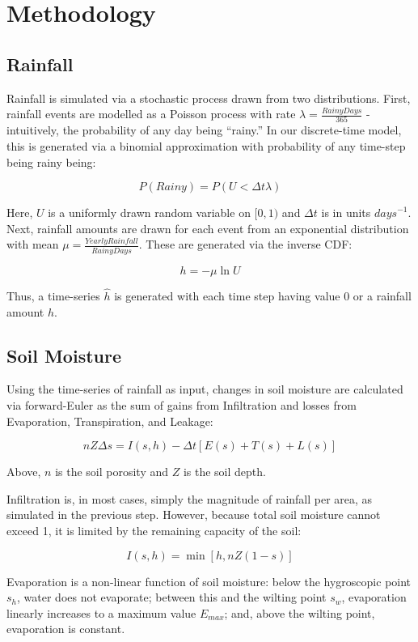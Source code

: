 \documentclass[12pt, letterpaper]{article}
\begin{document}
\section{Methodology}
\subsection{Rainfall}

Rainfall is simulated via a stochastic process drawn from two distributions. First, rainfall events are modelled as a Poisson process with rate $\lambda = \frac{RainyDays}{365}$ - intuitively, the probability of any day being “rainy.” In our discrete-time model, this is generated via a binomial approximation with probability of any time-step being rainy being:

$$ P(Rainy) = P(U < \Delta t \lambda) $$

Here, $U$ is a uniformly drawn random variable on $[0,1)$ and $\Delta t$ is in units ${days}^{-1}$. Next, rainfall amounts are drawn for each event from an exponential distribution with mean $\mu = \frac{YearlyRainfall}{RainyDays}$. These are generated via the inverse CDF:

$$ h = -\mu \ln{U} $$

Thus, a time-series $\hat{h}$ is generated with each time step having value $0$ or a rainfall amount $h$.

\subsection{Soil Moisture}

Using the time-series of rainfall as input, changes in soil moisture are calculated via forward-Euler as the sum of gains from Infiltration and losses from Evaporation, Transpiration, and Leakage:

$$ n Z \Delta s = I(s, h) - \Delta t \left[ E(s) + T(s) + L(s) \right]$$

Above, $n$ is the soil porosity and $Z$ is the soil depth.

Infiltration is, in most cases, simply the magnitude of rainfall per area, as simulated in the previous step. However, because total soil moisture cannot exceed 1, it is limited by the remaining capacity of the soil:

$$ I(s, h) = \min{[h, n Z (1-s)]} $$

Evaporation is a non-linear function of soil moisture: below the hygroscopic point $s_h$, water does not evaporate; between this and the wilting point $s_w$, evaporation linearly increases to a maximum value $E_{max}$; and, above the wilting point, evaporation is constant.
\end{document}
